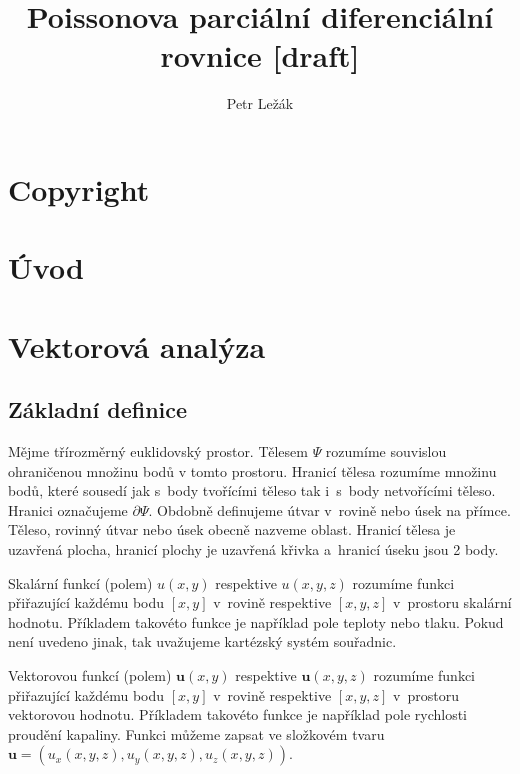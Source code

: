 \documentclass{book}
\title{Poissonova parciální diferenciální rovnice [draft]}
\author{Petr Ležák}
\newcommand{\vect}[1]{\boldsymbol{#1}}
\begin{document}
\maketitle

\section{Copyright}



\section{Úvod}

\section{Vektorová analýza}

\subsection{Základní definice}

Mějme třírozměrný euklidovský prostor. Tělesem \(\Psi\) rozumíme souvislou ohraničenou množinu bodů v tomto prostoru. Hranicí tělesa rozumíme množinu bodů, které sousedí jak s~body tvořícími těleso tak i~s~body netvořícími těleso. Hranici označujeme \(\partial \Psi\). Obdobně definujeme útvar v~rovině nebo úsek na přímce. Těleso, rovinný útvar nebo úsek obecně nazveme oblast. Hranicí tělesa je uzavřená plocha, hranicí plochy je uzavřená křivka a~hranicí úseku jsou 2 body. 


Skalární funkcí (polem) \(u(x, y)\) respektive \(u(x, y, z)\) rozumíme funkci přiřazující každému bodu \([x, y]\) v~rovině respektive \([x, y, z]\) v~prostoru skalární hodnotu. Příkladem takovéto funkce je například pole teploty nebo tlaku. Pokud není uvedeno jinak, tak uvažujeme kartézský systém souřadnic. 

Vektorovou funkcí (polem) \(\vect{u}(x, y)\) respektive \(\vect{u}(x, y, z)\) rozumíme funkci přiřazující každému bodu \([x, y]\)
 v~rovině respektive \([x, y, z]\) v~prostoru vektorovou hodnotu. Příkladem takovéto funkce je například pole rychlosti proudění kapaliny. Funkci můžeme zapsat ve složkovém tvaru \(\vect{u}=(u_x(x, y, z), u_y(x, y, z), u_z(x, y, z))\).
\end{document}
